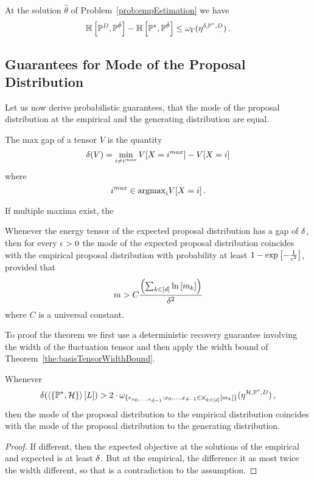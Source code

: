 \begin{corollary}
	At the solution $\hat{\theta}$ of Problem~\ref{prob:empEstimation} we have
		\[ \mathbb{H}\left[\mathbb{P}^{D},\mathbb{P}^{\hat{\theta}}\right] - \mathbb{H}\left[\mathbb{P}^*,\mathbb{P}^{\hat{\theta}}\right] \leq  \omega_{\Gamma}(\eta^{\delta, \mathbb{P}^*, D}) \, . \] 
\end{corollary}






\subsection{Guarantees for Mode of the Proposal Distribution}

Let us now derive probabilistic guarantees, that the mode of the proposal distribution at the empirical and the generating distribution are equal.

\begin{definition}
	The max gap of a tensor $V$ is the quantity
		\[ \delta(V) = \min_{i\neq i^{max}} V[X = i^{max}] - V[X=i] \]
	where
		\[ i^{max} \in \mathrm{argmax}_{i} V[X = i] \, . \]
\end{definition}

If multiple maxima exist, the



\begin{theorem}\label{the:probGuaranteeProposalDist}
	Whenever the energy tensor of the expected proposal distribution has a gap of $\delta$, then for every $\epsilon>0$ the mode of the expected proposal distribution coincides with the empirical proposal distribution with probability at least $1-\mathrm{exp}\left[-\frac{1}{\epsilon^2}\right]$, provided that
		\[ m > C\frac{\left(\sum_{k\in[d]}\ln \left[ m_{k} \right]\right)}{\delta^2} \]
	where $C$ is a universal constant.
\end{theorem}

To proof the theorem we first use a deterministic recovery guarantee involving the width of the fluctuation tensor and then apply the width bound of Theorem~\ref{the:basisTensorWidthBound}.

\begin{lemma}\label{lem:detGuaranteeProposalDist}
	Whenever 
	\begin{align*}
		\delta(\left\langle \{\mathbb{P}^*,\mathcal{H}\}\right\rangle \left[ L \right]) 
		> 2 \cdot  \omega_{\{e_{x_{0},\ldots,x_{d-1}} :x_{0},\ldots,x_{d-1}\in\bigtimes_{k\in[d]}[m_{k}]\}}(\eta^{\mathcal{H},\mathbb{P}^*,D}) \, , 
	\end{align*}
	then the mode of the proposal distribution to the empirical distribution coincides with the mode of the proposal distribution to the generating distribution.
\end{lemma}
\begin{proof}
	If different, then the expected objective at the solutions of the empirical and expected is at least $\delta$.
	But at the empirical, the difference it as most twice the width different, so that is a contradiction to the assumption.
\end{proof}


